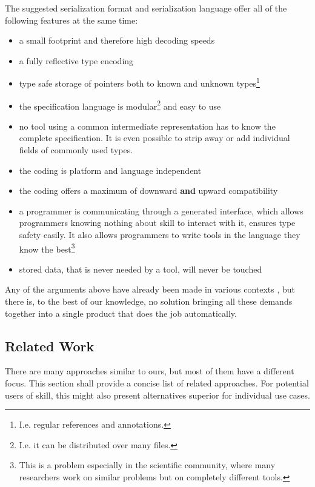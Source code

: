 The suggested serialization format and serialization language offer all of the following features at the same time:
\begin{itemize}
 \item a small footprint and therefore high decoding speeds
 \item a fully reflective type encoding
 \item type safe storage of pointers both to known and unknown types\footnote{I.e. regular references and annotations.}
 \item the specification language is modular\footnote{I.e. it can be distributed over many files.} and easy to use
 \item no tool using a common intermediate representation has to know the complete specification. It is even possible to strip away or add individual fields of commonly used types.
 \item the coding is platform and language independent
 \item the coding offers a maximum of downward \textbf{and} upward compatibility
 \item a programmer is communicating through a generated interface, which allows programmers knowing nothing about skill to interact with it, ensures type safety easily. It also allows programmers to write tools in the language they know the best\footnote{This is a problem especially in the scientific community, where many researchers work on similar problems but on completely different tools.}
 \item stored data, that is never needed by a tool, will never be touched
\end{itemize}

Any of the arguments above have already been made in various contexts , but there is, to the best of our knowledge, no solution bringing all these demands together into a single product that does the job automatically.


\subsection{Related Work}

There are many approaches similar to ours, but most of them have a different focus. This section shall provide a concise list of related approaches. For potential users of \gls{skill}, this might also present alternatives superior for individual use cases.

